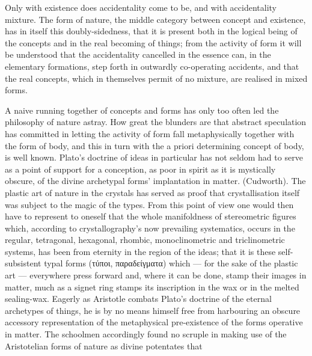 \documentclass[12pt,a4paper]{book}
\begin{document}
Only with existence does accidentality come to be, and with accidentality mixture. The form of nature, the middle
category between concept and existence, has in itself this doubly-sidedness, that it is present both in the logical being
of the concepts and in the real becoming of things; from the activity of form it will be understood that the accidentality
cancelled in the essence can, in the elementary formations, step forth in outwardly co-operating accidents, and that the
real concepts, which in themselves permit of no mixture, are realised in mixed forms.

A naive running together of concepts and forms has only too often led the philosophy of nature astray. How great the
blunders are that abstract speculation has committed in letting the activity of form fall metaphysically together with
the form of
body, and this in turn with the a priori determining concept of body, is well known. Plato's doctrine of ideas in
particular has not seldom had to serve as a point of support for a conception, as poor in spirit as it is mystically
obscure, of the divine archetypal forms' implantation in matter. (Cudworth). The plastic art of nature in the crystals
has served as proof that crystallisation itself was subject to the magic of the types. From this point of view one would
then have to represent to oneself that the whole manifoldness of stereometric figures which, according to crystallography's
now prevailing systematics, occurs in the regular, tetragonal, hexagonal, rhombic, monoclinometric and triclinometric
systems, has been from eternity in the region of the ideas; that it is these self-subsistent typal forms
(τύποι, παραδείγματα) which --- for the sake of the plastic art --- everywhere press forward and, where it can be done,
stamp their images in matter, much as a signet ring stamps its inscription in the wax or in the melted sealing-wax.
Eagerly as Aristotle combats Plato's doctrine of the eternal archetypes of things, he is by no means himself free from
harbouring an obscure accessory representation of the metaphysical pre-existence of the forms operative in matter.
The schoolmen accordingly found no scruple in making use of the Aristotelian forms of nature as divine potentates that
\end{document}
